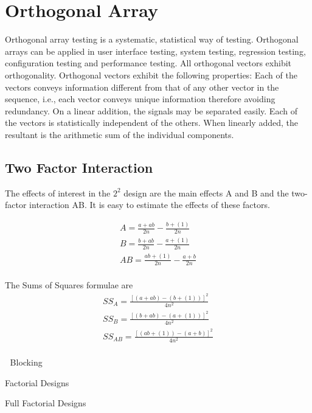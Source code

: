 \documentclass[]{article}
\begin{document}
\section{Orthogonal Array}
Orthogonal array testing is a systematic, statistical way of testing. Orthogonal arrays can be applied in user interface testing, system testing, regression testing, configuration testing and performance testing.
All orthogonal vectors exhibit orthogonality. Orthogonal vectors exhibit the following properties:
Each of the vectors conveys information different from that of any other vector in the sequence, i.e., each vector conveys unique information therefore avoiding redundancy.
On a linear addition, the signals may be separated easily.
Each of the vectors is statistically independent of the others.
When linearly added, the resultant is the arithmetic sum of the individual components.


\subsection{Two Factor Interaction}
The effects of interest in the $2^2$ design are the  main effects A and B and the two-factor interaction AB. It is easy to estimate the effects of these factors.

\begin{eqnarray}
A = \frac{a+ab}{2n} -  \frac{b + (1)}{2n}\\
B = \frac{b+ab}{2n} -  \frac{a + (1)}{2n}\\
AB = \frac{ab + (1)}{2n} -  \frac{a + b}{2n}\\
\end{eqnarray}

The Sums of Squares formulae are
\begin{eqnarray}
SS_{A} = \frac{[(a + ab)-(b + (1))]^2}{4n^2}\\
SS_{B} = \frac{[(b + ab)-(a + (1))]^2}{4n^2}\\
SS_{AB} = \frac{[(ab + (1))-(a + b)]^2}{4n^2}\\
\end{eqnarray}


\newpage


Blocking

Factorial Designs

Full Factorial Designs
\end{document}

